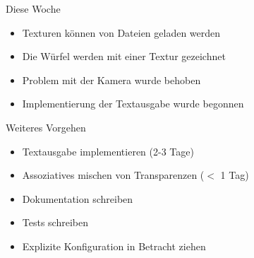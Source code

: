 \documentclass{../presentation}
\begin{document}
\frame[plain]{\titlepage}

\begin{frame}{Diese Woche}
    \begin{itemize}
        \item Texturen können von Dateien geladen werden
        \item Die Würfel werden mit einer Textur gezeichnet
        \item Problem mit der Kamera wurde behoben
        \item Implementierung der Textausgabe wurde begonnen
    \end{itemize}
\end{frame}

\begin{frame}{Weiteres Vorgehen}
    \begin{itemize}
        \item Textausgabe implementieren (2-3 Tage)
        \item Assoziatives mischen von Transparenzen ($<$ 1 Tag)
        \item Dokumentation schreiben
        \item Tests schreiben
        \item Explizite Konfiguration in Betracht ziehen
    \end{itemize}
\end{frame}
\end{document}
